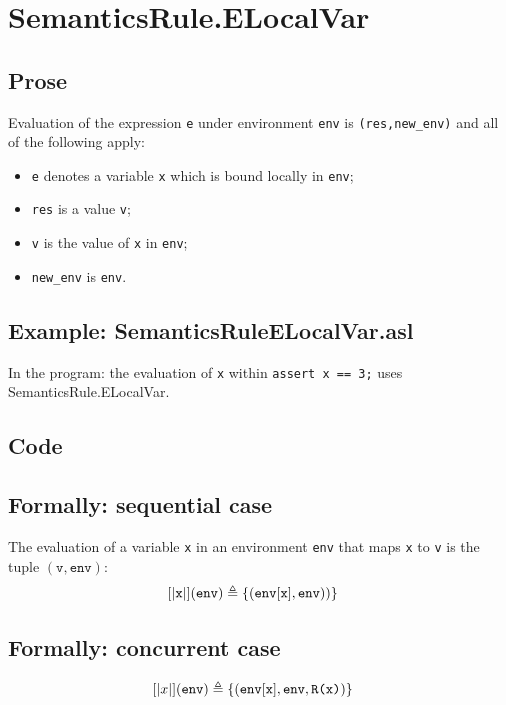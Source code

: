 \documentclass{book}
\begin{document}


\section{SemanticsRule.ELocalVar \label{sec:SemanticsRule.ELocalVar}}

  \subsection{Prose}
  Evaluation of the expression \texttt{e} under environment \texttt{env} is
  \texttt{(res,new\_env)} and all of the following apply:
  \begin{itemize}
  \item \texttt{e} denotes a variable \texttt{x} which is bound locally in \texttt{env};
  \item \texttt{res} is a value \texttt{v};
  \item \texttt{v} is the value of \texttt{x} in \texttt{env};
  \item \texttt{new\_env} is \texttt{env}.
  \end{itemize}

  \subsection{Example: SemanticsRuleELocalVar.asl}
    In the program:
    the evaluation of \texttt{x} within \texttt{assert x == 3;} uses SemanticsRule.ELocalVar.

  \subsection{Code}

\begin{formal}
  \subsection{Formally: sequential case}
  The evaluation of a variable \texttt{x} in an environment \texttt{env} that maps \texttt{x} to \texttt{v}
  is the tuple $(\texttt{v},\texttt{env})$:
  \begin{align}
  \left[| \texttt{x} \right|](\texttt{env}) & \triangleq \left\{ (\texttt{env}[\texttt{x}], \texttt{env})) \right\}
  \label{eq:sem-seq-var}
  \end{align}

  \subsection{Formally: concurrent case}
  \begin{align}
  \left[| x \right|](\texttt{env}) & \triangleq \left\{ (\texttt{env}[\texttt{x}], \texttt{env}, \texttt{R(x)}) \right\}
  \label{eq:sem-conc-var}
  \end{align}
\end{formal}
\end{document}
